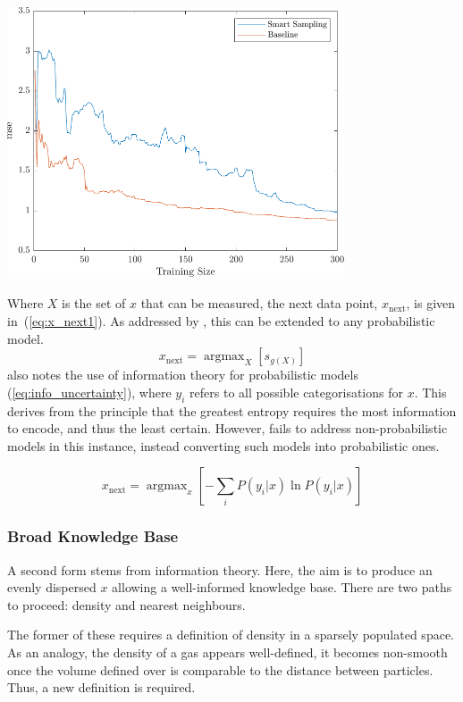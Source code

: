 \documentclass[a4paper, english]{report}
\DeclareMathOperator*{\argmax}{argmax}
\begin{document}
\includegraphics[width=100mm]{BR_300_1}

Where $X$ is the set of $x$ that can be measured, the next data point, $x_\mathrm{next}$, is given in~(\ref{eq:x_next1}). As addressed by \textcite{LitRev_2009}, this can be extended to any probabilistic model.
\begin{equation}
    \label{eq:x_next1}
    x_\mathrm{next}=\argmax_X{\left[s_{g(X)}\right]}
\end{equation}
\textcite{LitRev_2009} also notes the use of information theory for probabilistic models (\ref{eq:info_uncertainty}), where $y_i$ refers to all possible categorisations for $x$. This derives from the principle that the greatest entropy requires the most information to encode, and thus the least certain. However, \textcite{LitRev_2009} fails to address non-probabilistic models in this instance, instead converting such models into probabilistic ones.

\begin{equation}
    \label{eq:info_uncertainty}
    x_\mathrm{next}=\argmax_x{\left[-\sum_i{P(y_i|x)\ln{P(y_i|x)}}\right]}
\end{equation}

\subsubsection{Broad Knowledge Base}
A second form stems from information theory. Here, the aim is to produce an evenly dispersed $x$ allowing a well-informed knowledge base. There are two paths to proceed: density and nearest neighbours.

The former of these requires a definition of density in a sparsely populated space. As an analogy, the density of a gas appears well-defined, it becomes non-smooth once the volume defined over is comparable to the distance between particles. Thus, a new definition is required.
\end{document}
